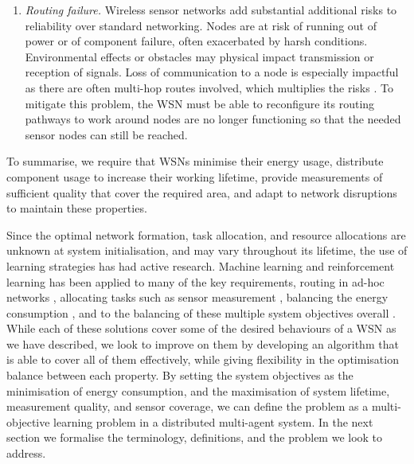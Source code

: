 \begin{enumerate}
\item \textit{Routing failure.} Wireless sensor networks add substantial additional risks to reliability over standard networking. Nodes are at risk of running out of power or of component failure, often exacerbated by harsh conditions. Environmental effects or obstacles may physical impact transmission or reception of signals. Loss of communication to a node is especially impactful as there are often multi-hop routes involved, which multiplies the risks \citep{Paradis2007}. To mitigate this problem, the WSN must be able to reconfigure its routing pathways to work around nodes are no longer functioning so that the needed sensor nodes can still be reached.
\end{enumerate}
To summarise, we require that WSNs minimise their energy usage, distribute component usage to increase their working lifetime, provide measurements of sufficient quality that cover the required area, and adapt to network disruptions to maintain these properties.

\ifdefined\DEBUG {} \else \fi
Since the optimal network formation, task allocation, and resource allocations are unknown at system initialisation, and may vary throughout its lifetime, the use of learning strategies has had active research. Machine learning and reinforcement learning has been applied to many of the key requirements, routing in ad-hoc networks \citep{Nurmi}, allocating tasks such as sensor measurement \citep{doi:10.1155/2014/765182}, balancing the energy consumption \citep{10.1007/978-3-642-11814-2_4, PraveenKumar2019a}, and to the balancing of these multiple system objectives overall \citep{SENGUPTA2013405, s150717572}. While each of these solutions cover some of the desired behaviours of a WSN as we have described, we look to improve on them by developing an algorithm that is able to cover all of them effectively, while giving flexibility in the optimisation balance between each property. By setting the system objectives as the minimisation of energy consumption, and the maximisation of system lifetime, measurement quality, and sensor coverage, we can define the problem as a multi-objective learning problem in a distributed multi-agent system. In the next section we formalise the terminology, definitions, and the problem we look to address.


